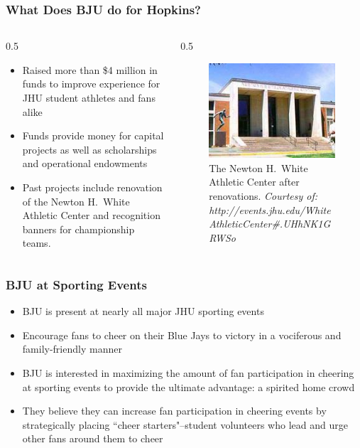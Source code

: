 \documentclass[compress,handout,10pt]{beamer}
\let\olditem\item
\renewcommand{\item}{\setlength{\itemsep}{0.5\baselineskip}\olditem}
\begin{document}
\begin{frame}
	\frametitle{What Does BJU do for Hopkins?}
	\begin {columns}
		\begin {column} {0.5\textwidth}
		\begin {itemize}
			\item Raised more than \$4 million in funds to improve experience for JHU student athletes and fans alike \cite{bjuwebsite}
			\item Funds provide money for capital projects as well as scholarships and operational endowments \cite{bjuwebsite}
			\item Past projects include renovation of the Newton H.~White Athletic Center and recognition banners for championship teams. \cite{bjuwebsite}
		\end {itemize}
	\end {column}
	\begin{column} {0.5\textwidth}
		\begin{figure}
			\begin{center}
				\includegraphics [width=2in] {AthleticCenter.jpg}
				\caption{{\tiny The Newton H.~White Athletic Center after renovations. \textit{Courtesy of: http://events.jhu.edu/WhiteAthleticCenter\#.UHhNK1GRWSo}}}
			\end{center}
		\end {figure}
	\end {column}
\end {columns}
\end {frame}

\begin{frame}
\frametitle{BJU at Sporting Events}
\begin{itemize}
\item BJU is present at nearly all major JHU sporting events
\item Encourage fans to cheer on their Blue Jays to victory in a vociferous and family-friendly manner
\item BJU is interested in maximizing the amount of fan participation in cheering at sporting events to provide the ultimate advantage: a spirited home crowd
\item They believe they can increase fan participation in cheering events by strategically placing ``cheer starters"--student volunteers who lead and urge other fans around them to cheer
\end{itemize}
\end{frame}
\end{document}
